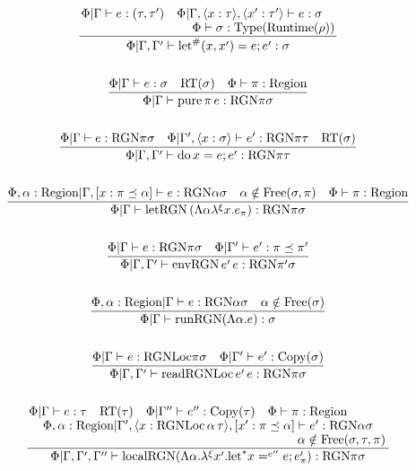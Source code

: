 \documentclass {article}
\begin{document}
\begin{gather*}
\\
\frac
{\splitfrac{\Phi | \Gamma \vdash e : (\tau, \tau') \quad \Phi | \Gamma , \langle x : \tau \rangle, \langle x' : \tau' \rangle \vdash e : \sigma  }
{\Phi \vdash \sigma : \text{Type} (\text{Runtime} (\rho)) }}
{\Phi | \Gamma, \Gamma' \vdash \text{let}^\# (x, x') = e; e' : \sigma} \\
\\
\frac
{\Phi | \Gamma \vdash e : \sigma \quad \text{RT}(\sigma) \quad \Phi \vdash \pi : \text{Region} }
{\Phi | \Gamma \vdash \text{pure} \, \pi \, e : \text{RGN} \pi \sigma } \\
\\
\frac
{\Phi | \Gamma \vdash e : \text{RGN} \pi \sigma \quad \Phi | \Gamma', \langle x : \sigma \rangle \vdash e' : \text{RGN} \pi \tau \quad \text{RT}(\sigma) }
{\Phi | \Gamma, \Gamma' \vdash \text{do} \, x = e; e' : \text{RGN} \pi \tau} \\
\\
\frac
{\Phi , \alpha : \text{Region} | \Gamma, [x : \pi \preceq \alpha] \vdash e : \text{RGN} \alpha \sigma \quad \alpha \notin \text{Free}(\sigma, \pi) \quad \Phi \vdash \pi : \text{Region}}
{\Phi | \Gamma \vdash \text{letRGN} \, (\Lambda \alpha \lambda^\xi x. e_\pi) : \text{RGN} \pi \sigma} \\
\\
\frac
{\Phi | \Gamma \vdash e : \text{RGN} \pi \sigma \quad \Phi | \Gamma' \vdash e' : \pi \preceq \pi'}
{\Phi | \Gamma, \Gamma' \vdash \text{envRGN} \, e' \, e : \text{RGN} \pi' \sigma } \\
\\
\frac
{\Phi, \alpha : \text{Region}| \Gamma \vdash e : \text{RGN} \alpha \sigma \quad \alpha \notin \text{Free}(\sigma)}
{\Phi | \Gamma \vdash \text{runRGN} (\Lambda \alpha. e) : \sigma}\\
\\
\frac
{\Phi | \Gamma \vdash e : \text{RGNLoc} \pi \sigma \quad \Phi | \Gamma' \vdash e' : \text{Copy} (\sigma) }
{\Phi | \Gamma, \Gamma' \vdash \text{readRGNLoc} \, e' \, e : \text{RGN} \pi \sigma} \\
\\
\frac
{\splitfrac{\Phi | \Gamma \vdash e : \tau \quad \text{RT} (\tau) \quad \Phi | \Gamma'' \vdash e'' :  \text{Copy} (\tau) \quad \Phi \vdash \pi : \text{Region}}
{\splitfrac{\Phi, \alpha : \text{Region} | \Gamma', \langle x : \text{RGNLoc} \, \alpha \, \tau \rangle , [x' : \pi \preceq \alpha] \vdash e' : \text{RGN} \alpha \sigma}
{\alpha \notin \text{Free}(\sigma, \tau, \pi)}}}
{\Phi | \Gamma, \Gamma', \Gamma'' \vdash \text{localRGN} (\Lambda \alpha. \lambda^\xi x'. \text{let}^* x =^{e''} e; e'_\pi ) : \text{RGN} \pi \sigma} \\

\end{gather*}
\end{document}
